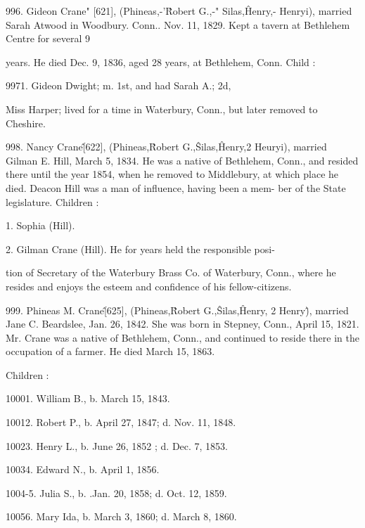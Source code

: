 996. Gideon Crane" [621], (Phineas,-'\^ Robert G.,-" Silas,\^ 
Henry,- Henryi), married Sarah Atwood in Woodbury. Conn.. 
Nov. 11, 1829. Kept a tavern at Bethlehem Centre for several 
9 




years. He died Dec. 9, 1836, aged 28 years, at Bethlehem, 
Conn. Child : 

9971. Gideon Dwight; m. 1st, and had Sarah A.; 2d, 

Miss Harper; lived for a time in Waterbury, Conn., but 
later removed to Cheshire. 

998. Nancy Crane\^ [622], (Phineas,\^ Robert G.,\^ Silas,\^ 
Henry,2 Heuryi), married Gilman E. Hill, March 5, 1834. He 
was a native of Bethlehem, Conn., and resided there until the 
year 1854, when he removed to Middlebury, at which place he 
died. Deacon Hill was a man of influence, having been a mem- 
ber of the State legislature. Children : 

1. Sophia (Hill). 

2. Gilman Crane (Hill). He for years held the responsible posi- 

tion of Secretary of the Waterbury Brass Co. of Waterbury, 
Conn., where he resides and enjoys the esteem and confidence 
of his fellow-citizens. 

999. Phineas M. Crane\^ [625], (Phineas,\^ Robert G.,\^ Silas,\^ 
Henry, 2 Henry\^), married Jane C. Beardslee, Jan. 26, 1842. 
She was born in Stepney, Conn., April 15, 1821. Mr. Crane 
was a native of Bethlehem, Conn., and continued to reside there 
in the occupation of a farmer. He died March 15, 1863. 

Children : 

10001. William B., b. March 15, 1843. 

10012. Robert P., b. April 27, 1847; d. Nov. 11, 1848. 

10023. Henry L., b. June 26, 1852 ; d. Dec. 7, 1853. 

10034. Edward N., b. April 1, 1856. 

1004-5. Julia S., b. .Jan. 20, 1858; d. Oct. 12, 1859. 

10056. Mary Ida, b. March 3, 1860; d. March 8, 1860. 

